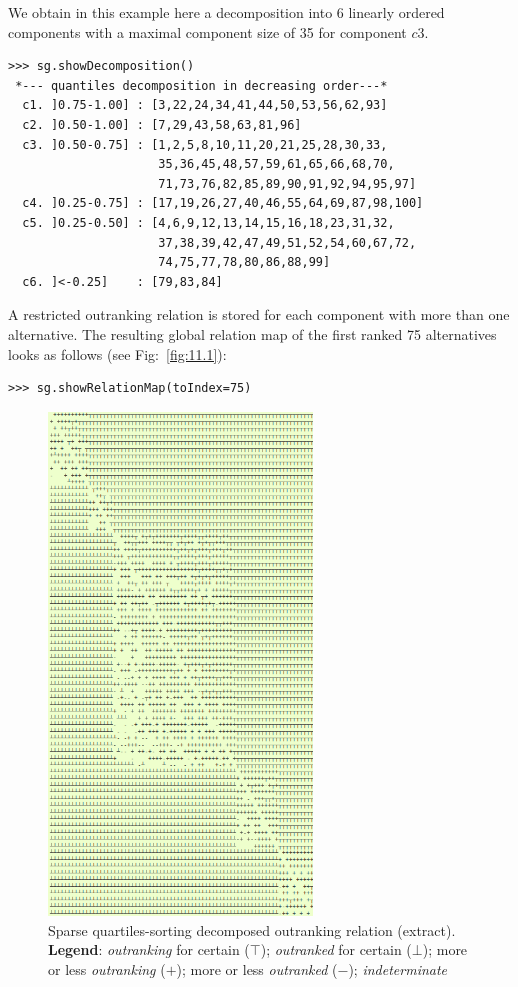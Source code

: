 We obtain in this example here a decomposition into 6 linearly ordered components with a maximal component size of 35 for component $c3$.

\begin{lstlisting}
>>> sg.showDecomposition()
 *--- quantiles decomposition in decreasing order---*
  c1. ]0.75-1.00] : [3,22,24,34,41,44,50,53,56,62,93]
  c2. ]0.50-1.00] : [7,29,43,58,63,81,96]
  c3. ]0.50-0.75] : [1,2,5,8,10,11,20,21,25,28,30,33,
                     35,36,45,48,57,59,61,65,66,68,70,
                     71,73,76,82,85,89,90,91,92,94,95,97]
  c4. ]0.25-0.75] : [17,19,26,27,40,46,55,64,69,87,98,100]
  c5. ]0.25-0.50] : [4,6,9,12,13,14,15,16,18,23,31,32,
                     37,38,39,42,47,49,51,52,54,60,67,72,
                     74,75,77,78,80,86,88,99]
  c6. ]<-0.25]    : [79,83,84]
\end{lstlisting}

A restricted outranking relation is stored for each component with more than one alternative. The resulting global relation map of the first ranked 75 alternatives looks as follows (see Fig:~\vref{fig:11.1}):
\begin{lstlisting}
>>> sg.showRelationMap(toIndex=75)
\end{lstlisting}  
\begin{figure}[h]
\sidecaption
\includegraphics[width=7cm]{Figures/11-1-sparseRelationMap.png}
\caption{Sparse quartiles-sorting decomposed outranking relation (extract). \textbf{Legend}: \emph{outranking} for certain ($\top$); \emph{outranked} for certain ($\bot$); more or less \emph{outranking} ($+$); more or less \emph{outranked} ($-$); \emph{indeterminate}}
\label{fig:11.1}       %
\end{figure}

